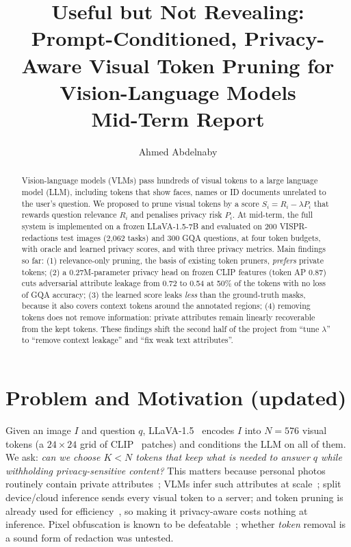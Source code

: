 \documentclass[10pt]{article}
\title{\vspace{-1.5em}\textbf{Useful but Not Revealing:}\\
Prompt-Conditioned, Privacy-Aware Visual Token Pruning for Vision-Language Models\\[2pt]
\large Mid-Term Report}
\author{Ahmed Abdelnaby}
\date{}
\newcommand{\R}{R}
\renewcommand{\Pr}{P}
\begin{document}
\maketitle
\vspace{-2.5em}

\begin{abstract}
\noindent
Vision-language models (VLMs) pass hundreds of visual tokens to a large language model (LLM), including tokens that show faces, names or ID documents unrelated
to the user's question. We proposed to prune visual tokens by a score $S_i=\R_i-\lambda \Pr_i$ that rewards question relevance $\R_i$ and penalises privacy risk $\Pr_i$.
At mid-term, the full system is implemented on a frozen LLaVA-1.5-7B and evaluated on 200 VISPR-redactions test images (2,062 tasks) and 300 GQA questions,
at four token budgets, with oracle and learned privacy scores, and with three privacy metrics. Main findings so far:
(1) relevance-only pruning, the basis of existing token pruners, \emph{prefers} private tokens;
(2) a 0.27M-parameter privacy head on frozen CLIP features (token AP 0.87) cuts adversarial attribute leakage from 0.72 to 0.54 at 50\% of the tokens with no loss of GQA accuracy;
(3) the learned score leaks \emph{less} than the ground-truth masks, because it also covers context tokens around the annotated regions;
(4) removing tokens does not remove information: private attributes remain linearly recoverable from the kept tokens.
These findings shift the second half of the project from ``tune $\lambda$'' to ``remove context leakage'' and ``fix weak text attributes''.
\end{abstract}

\section{Problem and Motivation (updated)}
Given an image $I$ and question $q$, LLaVA-1.5~\cite{liu2024llava15} encodes $I$ into $N{=}576$ visual tokens (a $24{\times}24$ grid of CLIP~\cite{radford2021clip} patches)
and conditions the LLM on all of them. We ask: \emph{can we choose $K<N$ tokens that keep what is needed to answer $q$ while withholding privacy-sensitive content?}
This matters because personal photos routinely contain private attributes~\cite{orekondy2017vispr}; VLMs infer such attributes at scale~\cite{tomekce2024private};
split device/cloud inference sends every visual token to a server; and token pruning is already used for efficiency~\cite{chen2024fastv,zhang2025sparsevlm,zhang2025vispruner,alvar2025divprune},
so making it privacy-aware costs nothing at inference. Pixel obfuscation is known to be defeatable~\cite{mcpherson2016defeating}; whether \emph{token} removal is a sound form of redaction was untested.
\end{document}

